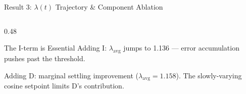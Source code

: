 \documentclass[aspectratio=169, 11pt]{beamer}
\begin{document}
\begin{frame}{Result 3: $\lambda(t)$ Trajectory \& Component Ablation}
\begin{columns}[T]
\begin{column}{0.48\textwidth}
\begin{alertblock}{The I-term is Essential}
\vspace{0.2em}
Adding I: $\lambda_\text{avg}$ jumps to 1.136 --- error accumulation pushes past the threshold.

\vspace{0.2em}
Adding D: marginal settling improvement ($\lambda_\text{avg}{=}1.158$). The slowly-varying cosine setpoint limits D's contribution.
\end{alertblock}
\end{column}
\end{columns}

\end{frame}
\end{document}
